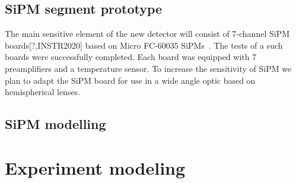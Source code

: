\documentclass[a4paper]{jpconf}
\begin{document}
\subsection{SiPM segment prototype }
The main sensitive element of the new detector will consist of 7-channel SiPM boards[?,INSTR2020] based on Micro FC-60035 SiPMs~\cite{TunkaSIT2020}. The tests of a such boards were successfully completed. Each board was equipped with 7 preamplifiers and a temperature sensor. To increase the sensitivity of SiPM we plan to adapt the SiPM board for use in a wide angle optic based on hemispherical lenses.

\subsection{SiPM modelling}

\section{Experiment modeling}
\end{document}
